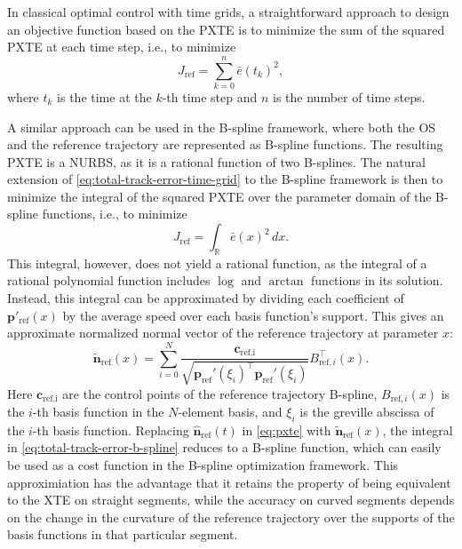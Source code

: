 In classical optimal control with time grids, a straightforward approach to design an objective function based on the PXTE is to minimize the sum of the squared PXTE at each time step, i.e., to minimize
\begin{equation}\label{eq:total-track-error-time-grid}
    J_\text{ref} = \sum_{k=0}^{n} \bar e(t_k)^2,
\end{equation}
where $t_k$ is the time at the $k$-th time step and $n$ is the number of time steps.

A similar approach can be used in the B-spline framework, where both the OS and the reference trajectory are represented as B-spline functions. The resulting PXTE is a NURBS, as it is a rational function of two B-splines. The natural extension of \cref{eq:total-track-error-time-grid} to the B-spline framework is then to minimize the integral of the squared PXTE over the parameter domain of the B-spline functions, i.e., to minimize
\begin{equation}\label{eq:total-track-error-b-spline}
J_\text{ref} = \int_\mathbb R \bar e(x)^2 \, dx.
\end{equation}
This integral, however, does not yield a rational function, as the integral of a rational polynomial function includes $\log$ and $\arctan$ functions in its solution. Instead, this integral can be approximated by dividing each coefficient of $\mathbf p'_\text{ref}(x)$ by the average speed over each basis function's support. This gives an approximate normalized normal vector of the reference trajectory at parameter $x$:
\begin{equation}\label{eq:approx-reference-normal-pxte}
    \mathbf{\tilde n}_{\mathrm{ref}}(x) = \sum_{i=0}^{N} \frac{\mathbf c_\text{ref,i} }{\sqrt{\mathbf p_\text{ref}'(\xi_i)^\top \mathbf p_\text{ref}'(\xi_i)}}B_{\mathrm{ref},i}^\top(x).
\end{equation}
Here $\mathbf c_\text{ref,i}$ are the control points of the reference trajectory B-spline, $B_{\mathrm{ref},i}(x)$ is the $i$-th basis function in the $N$-element basis, and $\xi_i$ is the greville abscissa of the $i$-th basis function. Replacing $\mathbf{\hat n}_{\mathrm{ref}}(t)$ in \cref{eq:pxte} with $\mathbf{\tilde n}_{\mathrm{ref}}(x)$, the integral in \cref{eq:total-track-error-b-spline} reduces to a B-spline function, which can easily be used as a cost function in the B-spline optimization framework. 
This approximiation has the advantage that it retains the property of being equivalent to the XTE on straight segments, while the accuracy on curved segments depends on the change in the curvature of the reference trajectory over the supports of the basis functions in that particular segment.



